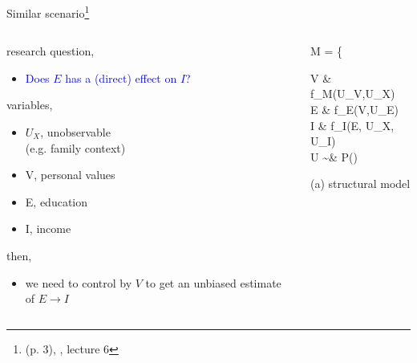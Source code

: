 \begin{frame}
	{Similar scenario\footnote{\citet{Cinelli_et_al_2021} (p. 3), \citet{McElreath_2022}, lecture 6}}
	\begin{columns}
		\begin{column}{0.5\textwidth}
			research question, 
			\begin{itemize}
				\item \textcolor{blue}{Does $E$ has a (direct) effect on $I$?}
			\end{itemize}
			
			variables,
			\begin{itemize}
				\item $U_{X}$, unobservable \\
				(e.g. family context)
				\item V, personal values
				\item E, education
				\item I, income
			\end{itemize}
			
			then,
			\begin{itemize}
				\item we need to control by $V$ to get an unbiased estimate of $E \rightarrow I$
			\end{itemize}
		\end{column}
		\begin{column}{0.5\textwidth}  
			\begin{equ}
				M = \left\{ \begin{aligned} 
					V \leftarrow & \; f_{M}(U_{V},U_{X}) \\
					E \leftarrow & \; f_{E}(V,U_{E}) \\
					I \leftarrow & \; f_{I}(E, U_{X}, U_{I}) \\
					U \sim & \; P()
				\end{aligned} \right
				\caption*{(a) structural model}
			\end{equ}
			\begin{figure}
\end{figure}
\end{column}
\end{columns}
\end{frame}
